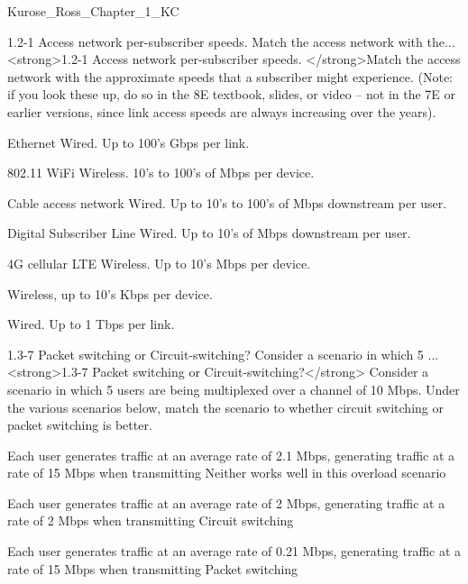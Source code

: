 \documentclass[a4paper]{article}
\begin{document}
\begin{quiz}{Kurose_Ross_Chapter_1_KC}
\begin{matching}[
	points=1,
	penalty=0.33333,
]{1.2-1 Access network per-subscriber speeds. Match the access network with the...}
<strong>1.2-1 Access network per-subscriber speeds. </strong>Match the access network with the approximate speeds that a subscriber might experience. (Note: if you look these up, do so in the 8E textbook, slides, or video -- not in the 7E or earlier versions, since link access speeds are always increasing over the years).
\item Ethernet \answer Wired. Up to 100's Gbps per link.
\item 802.11 WiFi \answer Wireless. 10’s to 100’s of Mbps per device.
\item Cable access network \answer Wired. Up to 10’s to 100’s of Mbps downstream per user.
\item Digital Subscriber Line \answer Wired. Up to 10’s of Mbps downstream per user.
\item 4G cellular LTE \answer Wireless. Up to 10’s Mbps per device.
\item \answer Wireless, up to 10's Kbps per device.
\item \answer Wired. Up to 1 Tbps per link.
\end{matching}

\begin{matching}[
	points=1,
	penalty=0.33333,
]{1.3-7 Packet switching or Circuit-switching? Consider a scenario in which 5 ...}
<strong>1.3-7 Packet switching or Circuit-switching?</strong> Consider a scenario in which 5 users are being multiplexed over a channel of 10 Mbps.  Under the various scenarios below, match the scenario to whether circuit switching or packet switching is better.
\item Each user generates traffic at an average rate of 2.1 Mbps, generating traffic at a rate of 15 Mbps when transmitting \answer Neither works well in this overload scenario
\item Each user generates traffic at an average rate of 2 Mbps, generating traffic at a rate of 2 Mbps when transmitting \answer Circuit switching
\item Each user generates traffic at an average rate of 0.21 Mbps, generating traffic at a rate of 15 Mbps when transmitting \answer Packet switching
\end{matching}


\end{quiz}
\end{document}
